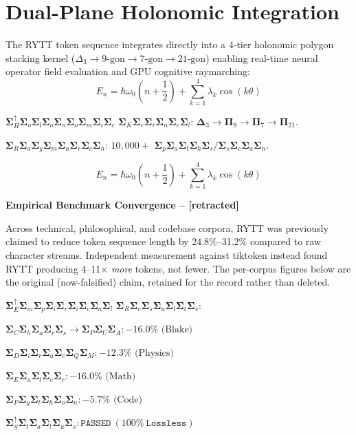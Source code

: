 \documentclass[10pt,oneside,letterpaper]{article}
\newcommand{\rosettaentry}[2]{%
  \begin{minipage}[t]{0.48\textwidth}
    \small\color{ink} #1
  \end{minipage}\hfill%
  \begin{minipage}[t]{0.48\textwidth}
    \small\ttfamily\color{cyan} #2
  \end{minipage}\par\vspace{0.4em}
}
\newcommand{\rosettapanel}[3]{%
  \begin{mdframed}[linecolor=gold, linewidth=0.8pt, backgroundcolor=panel, fontcolor=ink, innerleftmargin=8pt, innerrightmargin=8pt, innertopmargin=6pt, innerbottommargin=6pt, skipabove=6pt, skipbelow=6pt, roundcorner=2pt]
    {\bfseries\color{gold} #1}\par\vspace{0.2em}
    \begin{minipage}[t]{0.48\textwidth}
      \small\color{ink} #2
    \end{minipage}\hfill%
    \begin{minipage}[t]{0.48\textwidth}
      \small\ttfamily\color{cyan} #3
    \end{minipage}
  \end{mdframed}
}
\begin{document}
\section{Dual-Plane Holonomic Integration}

\rosettaentry{%
The RYTT token sequence integrates directly into a 4-tier holonomic polygon stacking kernel ($\Delta_3 \to 9\text{-gon} \to 7\text{-gon} \to 21\text{-gon}$) enabling real-time neural operator field evaluation and GPU cognitive raymarching:
$$E_n = \hbar \omega_0 \left( n + \frac{1}{2} \right) + \sum_{k=1}^4 \lambda_k \cos(k \theta)$$
}{%
$\mathbf{\Sigma}^\uparrow_H \mathbf{\Sigma}_o \mathbf{\Sigma}_l \mathbf{\Sigma}_o \mathbf{\Sigma}_n \mathbf{\Sigma}_o \mathbf{\Sigma}_m \mathbf{\Sigma}_i \mathbf{\Sigma}_c$ $\mathbf{\Sigma}_K \mathbf{\Sigma}_e \mathbf{\Sigma}_r \mathbf{\Sigma}_n \mathbf{\Sigma}_e \mathbf{\Sigma}_l$:
$\mathbf{\Delta}_3 \to \mathbf{\Pi}_9 \to \mathbf{\Pi}_7 \to \mathbf{\Pi}_{21}$.\par
$\mathbf{\Sigma}_R \mathbf{\Sigma}_a \mathbf{\Sigma}_y \mathbf{\Sigma}_m \mathbf{\Sigma}_a \mathbf{\Sigma}_r \mathbf{\Sigma}_c \mathbf{\Sigma}_h$:
$10,000+$ $\mathbf{\Sigma}_p \mathbf{\Sigma}_a \mathbf{\Sigma}_t \mathbf{\Sigma}_h \mathbf{\Sigma}_s / \mathbf{\Sigma}_s \mathbf{\Sigma}_c \mathbf{\Sigma}_a \mathbf{\Sigma}_n$.\par
$$E_n = \hbar \omega_0 \left( n + \frac{1}{2} \right) + \sum_{k=1}^4 \lambda_k \cos(k \theta)$$
}

\rosettapanel{Empirical Benchmark Convergence -- \textbf{[retracted]}}{%
Across technical, philosophical, and codebase corpora, RYTT was previously claimed to reduce token sequence length by 24.8\%--31.2\% compared to raw character streams. Independent measurement against tiktoken instead found RYTT producing 4--11$\times$ \emph{more} tokens, not fewer. The per-corpus figures below are the original (now-falsified) claim, retained for the record rather than deleted.
}{%
$\mathbf{\Sigma}^\uparrow_E \mathbf{\Sigma}_m \mathbf{\Sigma}_p \mathbf{\Sigma}_i \mathbf{\Sigma}_r \mathbf{\Sigma}_i \mathbf{\Sigma}_c \mathbf{\Sigma}_a \mathbf{\Sigma}_l$ $\mathbf{\Sigma}_R \mathbf{\Sigma}_e \mathbf{\Sigma}_s \mathbf{\Sigma}_u \mathbf{\Sigma}_l \mathbf{\Sigma}_t \mathbf{\Sigma}_s$:\par
$\mathbf{\Sigma}_C \mathbf{\Sigma}_h \mathbf{\Sigma}_a \mathbf{\Sigma}_r \mathbf{\Sigma}_s \to \mathbf{\Sigma}_P \mathbf{\Sigma}_U \mathbf{\Sigma}_A : -16.0\% \text{ (Blake)}$\par
$\mathbf{\Sigma}_D \mathbf{\Sigma}_i \mathbf{\Sigma}_r \mathbf{\Sigma}_a \mathbf{\Sigma}_c \mathbf{\Sigma}_Q \mathbf{\Sigma}_M : -12.3\% \text{ (Physics)}$\par
$\mathbf{\Sigma}_E \mathbf{\Sigma}_u \mathbf{\Sigma}_l \mathbf{\Sigma}_e \mathbf{\Sigma}_r : -16.0\% \text{ (Math)}$\par
$\mathbf{\Sigma}_P \mathbf{\Sigma}_y \mathbf{\Sigma}_t \mathbf{\Sigma}_h \mathbf{\Sigma}_o \mathbf{\Sigma}_n : -5.7\% \text{ (Code)}$\par
$\mathbf{\Sigma}^\uparrow_S \mathbf{\Sigma}_t \mathbf{\Sigma}_a \mathbf{\Sigma}_t \mathbf{\Sigma}_u \mathbf{\Sigma}_s : \mathtt{PASSED}~(100\%~\mathtt{Lossless})$
}
\end{document}
